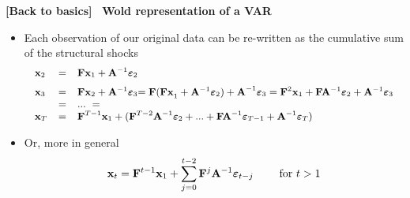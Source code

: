 \documentclass[10pt,handout]{beamer}
\begin{document}
\begin{frame}
{{\footnotesize \textbf{[Back to basics]}} \textbf{\ Wold representation of
a VAR}}

\begin{itemize}
\item Each observation of our original data can be re-written as the
cumulative sum of the structural shocks%
\begin{equation*}
{\small 
\begin{array}{lll}
\mathbf{x}_{2} & = & \mathbf{Fx}_{1}+\mathbf{A}^{-1}\mathbf{\varepsilon }%
_{2}\medskip \\ 
\mathbf{x}_{3} & = & \mathbf{Fx}_{2}+\mathbf{A}^{-1}\mathbf{\varepsilon }_{3}%
\mathbf{=F(\mathbf{Fx}}_{1}+\mathbf{A}^{-1}\mathbf{\varepsilon }_{2}\mathbf{%
)+A}^{-1}\mathbf{\varepsilon }_{3}=\mathbf{F}^{2}\mathbf{x}_{1}+\mathbf{FA}%
^{-1}\mathbf{\varepsilon }_{2}+\mathbf{A}^{-1}\mathbf{\varepsilon }_{3} \\ 
& = & ...\ = \\ 
\mathbf{x}_{T} & = & \mathbf{F}^{T-1}\mathbf{x}_{1}+(\mathbf{F}^{T-2}\mathbf{%
A}^{-1}\mathbf{\varepsilon }_{2}+...+\mathbf{FA}^{-1}\mathbf{\varepsilon }%
_{T-1}+\mathbf{A}^{-1}\mathbf{\varepsilon }_{T})%
\end{array}%
}
\end{equation*}%
\pause

\item Or, more in general%
\begin{equation*}
\mathbf{x}_{t}=\mathbf{F}^{t-1}\mathbf{x}_{1}+\sum\limits_{j=0}^{t-2}\mathbf{%
F}^{j}\mathbf{A}^{-1}\mathbf{\varepsilon }_{t-j}\ \ \ \ \ \text{for }t>1
\end{equation*}
\end{itemize}
\end{frame}

\everymath\expandafter{\the\everymath \color{title!80}}
\everydisplay\expandafter{\the\everydisplay \color{title!80}}%
\end{document}
